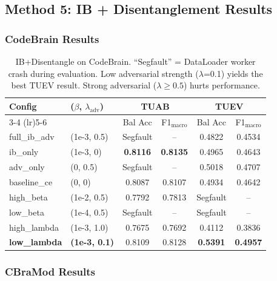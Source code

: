 \documentclass{article}
\begin{document}
\subsection{Method 5: IB + Disentanglement Results}

\subsubsection{CodeBrain Results}

\begin{table}[h]
\centering
\small
\begin{tabular}{@{}llcccc@{}}
\toprule
Config & ($\beta$, $\lambda_\text{adv}$) & \multicolumn{2}{c}{TUAB} & \multicolumn{2}{c}{TUEV} \\
\cmidrule(lr){3-4} \cmidrule(lr){5-6}
& & Bal Acc & F1$_\text{macro}$ & Bal Acc & F1$_\text{macro}$ \\
\midrule
full\_ib\_adv & (1e-3, 0.5) & Segfault & -- & 0.4822 & 0.4534 \\
ib\_only & (1e-3, 0) & \textbf{0.8116} & \textbf{0.8135} & 0.4965 & 0.4643 \\
adv\_only & (0, 0.5) & Segfault & -- & 0.5018 & 0.4707 \\
baseline\_ce & (0, 0) & 0.8087 & 0.8107 & 0.4934 & 0.4642 \\
high\_beta & (1e-2, 0.5) & 0.7792 & 0.7813 & Segfault & -- \\
low\_beta & (1e-4, 0.5) & Segfault & -- & Segfault & -- \\
high\_lambda & (1e-3, 1.0) & 0.7675 & 0.7692 & 0.4112 & 0.3836 \\
\textbf{low\_lambda} & \textbf{(1e-3, 0.1)} & 0.8109 & 0.8128 & \textbf{0.5391} & \textbf{0.4957} \\
\bottomrule
\end{tabular}
\caption{IB+Disentangle on CodeBrain. ``Segfault'' = DataLoader worker crash during evaluation. Low adversarial strength ($\lambda$=0.1) yields the best TUEV result. Strong adversarial ($\lambda \geq 0.5$) hurts performance.}
\end{table}

\subsubsection{CBraMod Results}
\end{document}
